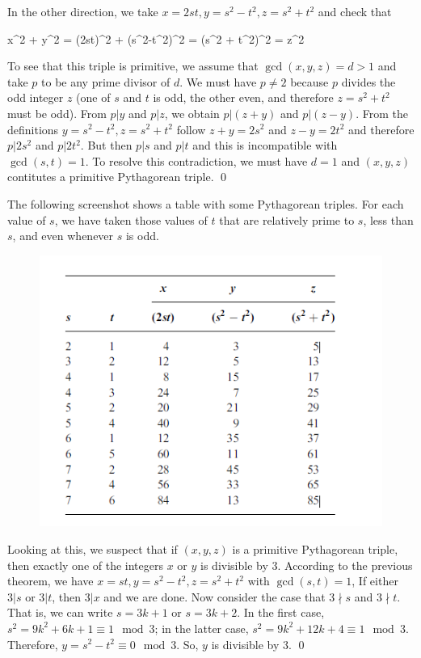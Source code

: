 In the other direction, we take $x = 2st, y = s^2-t^2, z = s^2 + t^2$ and check that

\bee
x^2 + y^2 = (2st)^2 + (s^2-t^2)^2 = (s^2 + t^2)^2 = z^2
\eee

To see that this triple is primitive, we assume that $\gcd(x,y,z) = d > 1$ and take $p$ to be any prime divisor of $d$. We must have $p \neq 2$ because $p$ divides the odd integer $z$ (one of $s$ and $t$ is odd, the other even, and therefore $z = s^2 + t^2$ must be odd). From $p | y$ and $p|z$, we obtain $p | (z+y)$ and $p | (z-y)$. From the definitions $y = s^2-t^2, z = s^2 + t^2$ follow $z+y=2s^2$ and $z-y=2t^2$ and therefore $p|2s^2$ and $p|2t^2$. But then $p|s$ and $p|t$ and this is incompatible with $\gcd(s,t)=1$. To resolve this contradiction, we must have $d=1$ and $(x,y,z)$ contitutes a primitive Pythagorean triple. \qed

The following screenshot shows a table with some Pythagorean triples. For each value of $s$, we have taken those values of $t$ that are relatively prime to $s$, less than $s$, and even whenever $s$ is odd.

\begin{figure}[H]
    \centering
    \includegraphics[scale=0.75]{images/2023-03-28-triples.png}
\end{figure}

Looking at this, we suspect that if $(x , y, z)$ is a primitive Pythagorean triple, then exactly one of the integers $x$ or $y$ is divisible by $3$. According to the previous theorem, we have $x=st, y=s^2-t^2, z=s^2+t^2$ with $\gcd(s,t)=1$, If either $3|s$ or $3|t$, then $3|x$ and we are done. Now consider the case that $3 \nmid s$ and $3 \nmid t$. That is, we can write $s = 3k+1$ or $s=3k+2$. In the first case, $s^2 =  9k^2 + 6k + 1 \equiv 1 \mod 3$; in the latter case, $s^2 = 9k^2 + 12k + 4 \equiv 1 \mod 3$. Therefore, $y = s^2 - t^2 \equiv 0 \mod 3$. So, $y$ is divisible by $3$. \qed

